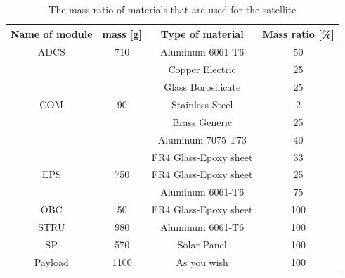 \documentclass[12pt, a4paper,titlepage]{article}
\numberwithin{equation}{section}
\numberwithin{figure}{section}
\begin{document}
\begin{table}[h!]
\begin{center}
\begin{tabular}{ |c|c|c|c|} 
 \hline
 Name of module & mass [g] & Type of material & Mass ratio [\%]\\\hline
 ADCS &	710	& Aluminum 6061-T6 &	50\\
			& & Copper Electric	& 25 \\
			& &  Glass Borosilicate 	& 25\\\hline
COM	& 	90	& 	Stainless Steel 	& 2\\
			& 	& Brass Generic		& 25\\
			& 	& Aluminum 7075-T73		& 40\\
			& 	& FR4 Glass-Epoxy sheet	& 	33\\\hline
EPS	& 	750	& 	FR4 Glass-Epoxy sheet		& 25\\
			& 	& Aluminum 6061-T6		& 75\\\hline
OBC	&	50		& FR4 Glass-Epoxy sheet	& 	100\\\hline
STRU	& 	980		& Aluminum 6061-T6	& 	100\\\hline
SP	& 	570		& Solar Panel	& 	100\\\hline
Payload	& 	1100	& 	As you wish	& 	100\\
 \hline
\end{tabular}
\end{center}
\caption{The mass ratio of materials that are used for the satellite}
\end{table}
\end{document}
